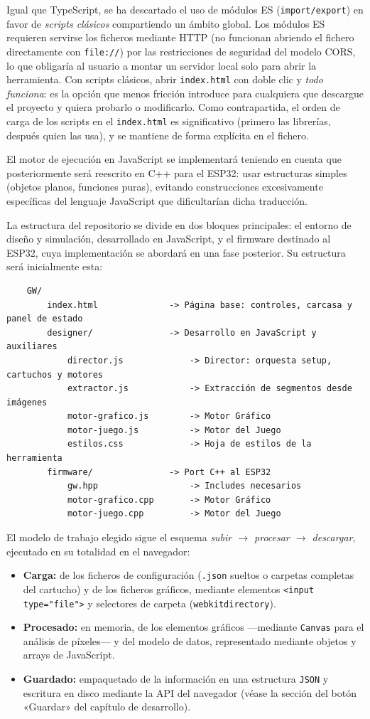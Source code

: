 \documentclass[../main.tex]{subfiles}
\begin{document}
Igual que TypeScript, se ha descartado el uso de módulos ES (\texttt{import/export}) en favor de \emph{scripts clásicos} compartiendo un ámbito global. Los módulos ES requieren servirse los ficheros mediante HTTP (no funcionan abriendo el fichero directamente con \texttt{file://}) por las restricciones de seguridad del modelo CORS, lo que obligaría al usuario a montar un servidor local solo para abrir la herramienta. Con scripts clásicos, abrir \texttt{index.html} con doble clic y \emph{todo funciona}: es la opción que menos fricción introduce para cualquiera que descargue el proyecto y quiera probarlo o modificarlo. Como contrapartida, el orden de carga de los scripts en el \texttt{index.html} es significativo (primero las librerías, después quien las usa), y se mantiene de forma explícita en el fichero.

El motor de ejecución en JavaScript se implementará teniendo en cuenta que posteriormente será reescrito en C++ para el ESP32: usar estructuras simples (objetos planos, funciones puras), evitando construcciones excesivamente específicas del lenguaje JavaScript que dificultarían dicha traducción.

La estructura del repositorio se divide en dos bloques principales: el entorno de diseño y simulación, desarrollado en JavaScript, y el firmware destinado al ESP32, cuya implementación se abordará en una fase posterior. Su estructura será inicialmente esta:

\begin{verbatim}
	GW/
		index.html          	-> Página base: controles, carcasa y panel de estado
		designer/				-> Desarrollo en JavaScript y auxiliares
			director.js     		-> Director: orquesta setup, cartuchos y motores
			extractor.js    		-> Extracción de segmentos desde imágenes
			motor-grafico.js		-> Motor Gráfico
			motor-juego.js			-> Motor del Juego
			estilos.css     		-> Hoja de estilos de la herramienta			
		firmware/           	-> Port C++ al ESP32
			gw.hpp					-> Includes necesarios
			motor-grafico.cpp		-> Motor Gráfico
			motor-juego.cpp			-> Motor del Juego
\end{verbatim}

El modelo de trabajo elegido sigue el esquema \emph{subir $\rightarrow$ procesar $\rightarrow$ descargar}, ejecutado en su totalidad en el navegador:

\begin{itemize}
	\item \textbf{Carga:} de los ficheros de configuración (\texttt{.json} sueltos o carpetas completas del cartucho) y de los ficheros gráficos, mediante elementos \texttt{<input type="file">} y selectores de carpeta (\texttt{webkitdirectory}).
	\item \textbf{Procesado:} en memoria, de los elementos gráficos —mediante \texttt{Canvas} para el análisis de píxeles— y del modelo de datos, representado mediante objetos y arrays de JavaScript.
	\item \textbf{Guardado:} empaquetado de la información en una estructura \texttt{JSON} y escritura en disco mediante la API del navegador (véase la sección del botón «Guardar» del capítulo de desarrollo).
\end{itemize}
\end{document}
